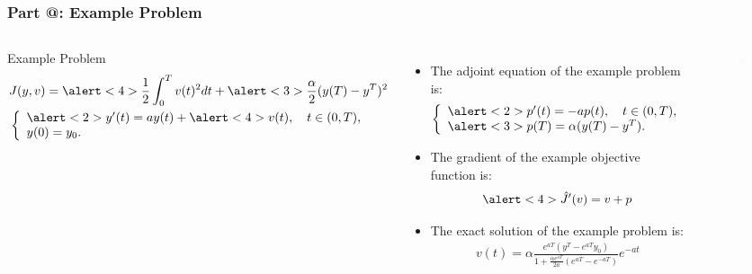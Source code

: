\documentclass[9pt]{beamer}
\makeatletter
\newcommand*{\rom}[1]{\expandafter\@slowromancap\romannumeral #1@}
\makeatother
\begin{document}
\begin{frame}
\frametitle{\textbf{ Part \rom{2}:} Example Problem}
\begin{columns}
\begin{block}{Example Problem}
\begin{align*}
&J(y,v) = \alert<4>{\frac{1}{2}\int_0^Tv(t)^2dt} + \alert<3>{\frac{\alpha}{2}(y(T)-y^T)^2} \\
&\left\{
     \begin{array}{lr}
       	\alert<2>{y'(t)=ay(t) + \alert<4>{v(t)}}, \quad  t\in(0,T),\\
       	y(0)=y_0.
     \end{array}
   \right. 
\end{align*}
\end{block}
\begin{itemize}
\item{{\small The adjoint equation of the example problem is:}
{\small
\begin{align*}
\left\{
     \begin{array}{lr}
       	\alert<2>{p'(t)=-ap(t)}, \quad  t\in(0,T),\\
       	\alert<3>{p(T)=\alpha(y(T)-y^T)}.
     \end{array}
   \right. 
\end{align*}
}}
\item{{\small The gradient of the example objective function is:}{\small
\begin{align*}
\alert<4>{\hat{J}'(v) = v+p}
\end{align*}
}}
\item{{\small The exact solution of the example problem is:}
{\small 
\begin{align*}
v(t) = \alpha\frac{e^{aT}(y^T-e^{aT}y_0)}{1+\frac{\alpha e^{aT}}{2a}(e^{aT}-e^{-aT})}e^{-at}
\end{align*}}}
\end{itemize}
\begin{figure}
\includegraphics[scale=0.24]{ype.png}

\end{figure}
\end{columns}
\end{frame}
\end{document}
